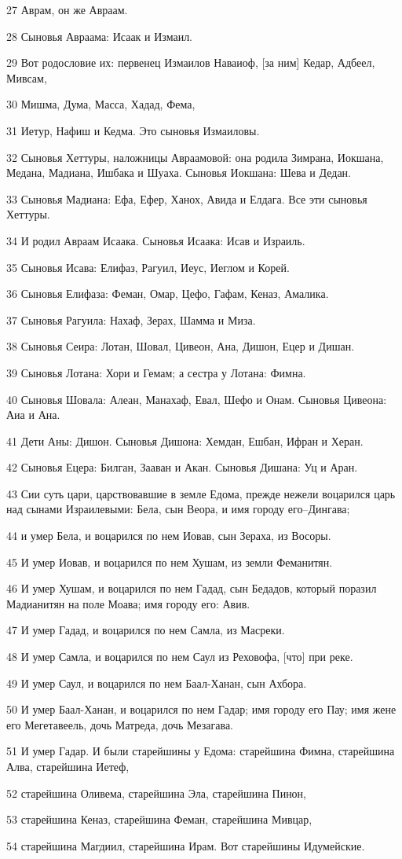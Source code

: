 \par 27 Аврам, он же Авраам.
\par 28 Сыновья Авраама: Исаак и Измаил.
\par 29 Вот родословие их: первенец Измаилов Наваиоф, [за ним] Кедар, Адбеел, Мивсам,
\par 30 Мишма, Дума, Масса, Хадад, Фема,
\par 31 Иетур, Нафиш и Кедма. Это сыновья Измаиловы.
\par 32 Сыновья Хеттуры, наложницы Авраамовой: она родила Зимрана, Иокшана, Медана, Мадиана, Ишбака и Шуаха. Сыновья Иокшана: Шева и Дедан.
\par 33 Сыновья Мадиана: Ефа, Ефер, Ханох, Авида и Елдага. Все эти сыновья Хеттуры.
\par 34 И родил Авраам Исаака. Сыновья Исаака: Исав и Израиль.
\par 35 Сыновья Исава: Елифаз, Рагуил, Иеус, Иеглом и Корей.
\par 36 Сыновья Елифаза: Феман, Омар, Цефо, Гафам, Кеназ, Амалика.
\par 37 Сыновья Рагуила: Нахаф, Зерах, Шамма и Миза.
\par 38 Сыновья Сеира: Лотан, Шовал, Цивеон, Ана, Дишон, Ецер и Дишан.
\par 39 Сыновья Лотана: Хори и Гемам; а сестра у Лотана: Фимна.
\par 40 Сыновья Шовала: Алеан, Манахаф, Евал, Шефо и Онам. Сыновья Цивеона: Аиа и Ана.
\par 41 Дети Аны: Дишон. Сыновья Дишона: Хемдан, Ешбан, Ифран и Херан.
\par 42 Сыновья Ецера: Билган, Зааван и Акан. Сыновья Дишана: Уц и Аран.
\par 43 Сии суть цари, царствовавшие в земле Едома, прежде нежели воцарился царь над сынами Израилевыми: Бела, сын Веора, и имя городу его--Дингава;
\par 44 и умер Бела, и воцарился по нем Иовав, сын Зераха, из Восоры.
\par 45 И умер Иовав, и воцарился по нем Хушам, из земли Феманитян.
\par 46 И умер Хушам, и воцарился по нем Гадад, сын Бедадов, который поразил Мадианитян на поле Моава; имя городу его: Авив.
\par 47 И умер Гадад, и воцарился по нем Самла, из Масреки.
\par 48 И умер Самла, и воцарился по нем Саул из Реховофа, [что] при реке.
\par 49 И умер Саул, и воцарился по нем Баал-Ханан, сын Ахбора.
\par 50 И умер Баал-Ханан, и воцарился по нем Гадар; имя городу его Пау; имя жене его Мегетавеель, дочь Матреда, дочь Мезагава.
\par 51 И умер Гадар. И были старейшины у Едома: старейшина Фимна, старейшина Алва, старейшина Иетеф,
\par 52 старейшина Оливема, старейшина Эла, старейшина Пинон,
\par 53 старейшина Кеназ, старейшина Феман, старейшина Мивцар,
\par 54 старейшина Магдиил, старейшина Ирам. Вот старейшины Идумейские.

